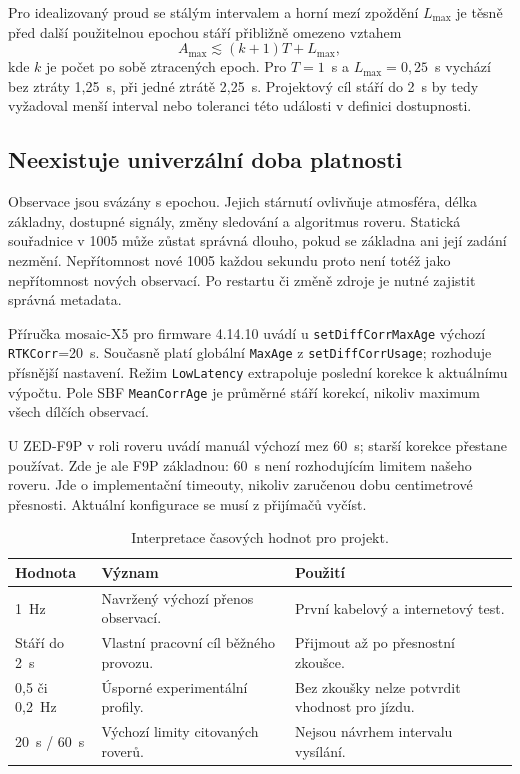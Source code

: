 \documentclass[11pt,a4paper]{article}
\begin{document}
Pro idealizovaný proud se stálým intervalem a horní mezí zpoždění $L_{\max}$ je těsně před další použitelnou epochou stáří přibližně omezeno vztahem
\begin{equation}
 A_{\max}\lesssim(k+1)T+L_{\max},
\end{equation}
kde $k$ je počet po sobě ztracených epoch. Pro $T=1$~s a $L_{\max}=0{,}25$~s vychází bez ztráty 1,25~s, při jedné ztrátě 2,25~s. Projektový cíl stáří do 2~s by tedy vyžadoval menší interval nebo toleranci této události v definici dostupnosti.

\subsection{Neexistuje univerzální doba platnosti}
Observace jsou svázány s epochou. Jejich stárnutí ovlivňuje atmosféra, délka základny, dostupné signály, změny sledování a algoritmus roveru. Statická souřadnice v 1005 může zůstat správná dlouho, pokud se základna ani její zadání nezmění. Nepřítomnost nové 1005 každou sekundu proto není totéž jako nepřítomnost nových observací. Po restartu či změně zdroje je nutné zajistit správná metadata.

Příručka mosaic-X5 pro firmware 4.14.10 uvádí u \texttt{setDiffCorrMaxAge} výchozí \texttt{RTKCorr}=20~s. Současně platí globální \texttt{MaxAge} z \texttt{setDiffCorrUsage}; rozhoduje přísnější nastavení. Režim \texttt{LowLatency} extrapoluje poslední korekce k aktuálnímu výpočtu. Pole SBF \texttt{MeanCorrAge} je průměrné stáří korekcí, nikoliv maximum všech dílčích observací.\cite{mosaic}

U ZED-F9P v roli roveru uvádí manuál výchozí mez 60~s; starší korekce přestane používat.\cite{f9p} Zde je ale F9P základnou: 60~s není rozhodujícím limitem našeho roveru. Jde o implementační timeouty, nikoliv zaručenou dobu centimetrové přesnosti. Aktuální konfigurace se musí z přijímačů vyčíst.

\par
\begin{table}[htbp]\centering\small
\caption{Interpretace časových hodnot pro projekt.}
\begin{tabularx}{\linewidth}{L{30mm}YY}\toprule
Hodnota & Význam & Použití\\~Hz & Navržený výchozí přenos observací. & První kabelový a internetový test.\\
Stáří do 2~s & Vlastní pracovní cíl běžného provozu. & Přijmout až po přesnostní zkoušce.\\
0,5 či 0,2~Hz & Úsporné experimentální profily. & Bez zkoušky nelze potvrdit vhodnost pro jízdu.\\
20~s / 60~s & Výchozí limity citovaných roverů. & Nejsou návrhem intervalu vysílání.\\
\bottomrule\end{tabularx}\end{table}
\par
\end{document}
